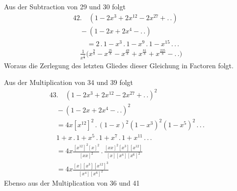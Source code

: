 Aus der Subtraction von 29 und 30 folgt
\[
\begin{gathered}
42.\quad (1-2x^3+2x^{12}-2x^{27}+ .\,.)\\[8pt]\quad{}-(1-2x+2x^4- .\,.)\\[8pt]
\qquad=2\,.\,1-x^3\,.\,1-x^9\,.\,1-x^{15}\,.\,.\,.\,
\\[8pt]\quad{}\frac{1}{x^{\frac18}}\bigl(x^{\frac98}-x^{\frac{25}{8}}-x^{\frac{49}{8}}+x^{\frac{81}{8}}+x^{\frac{225}{8}}- .\,.\bigr)
\end{gathered}
\]
Woraus die Zerlegung des letzten Gliedes dieser Gleichung in Factoren folgt.

Aus der Multiplication von 34 und 39 folgt
\[
\begin{gathered}
43.\quad (1-2x^3+2x^{12}-2x^{27}+ .\,.)^2\\[8pt]\quad{}-(1-2x+2x^4- .\,.)^2\\[8pt]
\quad=4x[x^{12}]^2\,.\,(1-x)^2(1-x^3)^2(1-x^5)^2\,.\,.\,.\,\\[8pt]\quad{}
1+x\,.\,1+x^5\,.\,1+x^7\,.\,1+x^{11}\,.\,.\,.\\[8pt]
\quad=4x\frac{[x^{12}]^2[x]^2}{[xx]^2}\,.\,
\frac{[xx]^2[x^3][x^{12}]}{[x][x^4][x^6]^2}
\\[8pt]\quad{}=4x\frac{[x][x^3][x^{12}]^3}{[x^4][x^6]^2}
\end{gathered}
\]
Ebenso aus der Multiplication von 36 und 41

